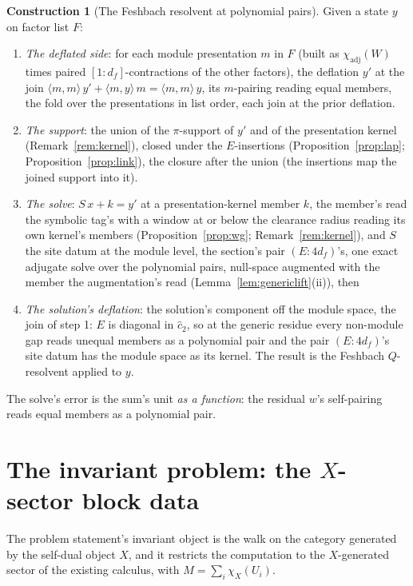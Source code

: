 \documentclass[11pt]{article}
\theoremstyle{definition}
\newtheorem{construction}{Construction}
\begin{document}
\begin{construction}[The Feshbach resolvent at polynomial pairs]\label{con:res}
Given a state $y$ on factor list $F$:
\begin{enumerate}[leftmargin=2em,itemsep=1pt]
\item \emph{The deflated side}: for each module presentation
$m$ in $F$ (built as $\chi_{\mathrm{adj}}(W)$ times paired
$[1\!:\!d_f]$-contractions of the other factors), the deflation
$y'$ at the join
$\langle m,m\rangle\,y'+\langle m,y\rangle\,m
=\langle m,m\rangle\,y$, its $m$-pairing reading equal members, the
fold over the presentations in list order, each join at the prior
deflation.
\item \emph{The support}: the union of the $\pi$-support of $y'$ and
of the presentation kernel (Remark~\ref{rem:kernel}), closed
under the $E$-insertions (Proposition~\ref{prop:lap};
Proposition~\ref{prop:link}), the closure after the
union (the insertions map the joined support into it).
\item \emph{The solve}: $S\,x+k=y'$ at a presentation-kernel
member $k$, the member's read the symbolic tag's with a window at
or below the clearance radius reading its own kernel's members
(Proposition~\ref{prop:wg}; Remark~\ref{rem:kernel}), and $S$ the
site datum at the module level, the section's pair
$(E\!:\!4d_f)$'s, one exact
adjugate solve over the polynomial pairs, null-space augmented
with the member the augmentation's read
(Lemma~\ref{lem:genericlift}(ii)), then
\item \emph{The solution's deflation}: the solution's component off
the module space, the join of step 1:
$E$ is diagonal in $\hat c_2$, so at the generic residue every non-module gap
reads unequal members as a polynomial pair and the pair
$(E\!:\!4d_f)$'s site datum has the module space as its kernel. The
result is the Feshbach $Q$-resolvent applied to $y$.
\end{enumerate}
The solve's error is the sum's unit \emph{as a function}: the residual
$w$'s self-pairing reads equal members as a polynomial pair.
\end{construction}

\section{The invariant problem: the $X$-sector block data}

The problem statement's invariant object is the walk on the category
generated by the self-dual object $X$, and it restricts the
computation to the $X$-generated sector of the existing
calculus, with $M=\sum_i\chi_X(U_i)$.
\end{document}

